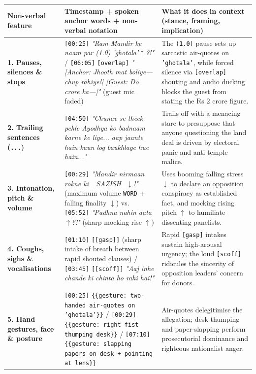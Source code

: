 \documentclass[10pt,a4paper]{article}
\begin{document}
\begin{longtable}{|p{}|p{}|p{}|}
\hline
Non-verbal feature & Timestamp + spoken anchor words + non-verbal notation & What it does in context (stance, framing, implication) \\ \hline \endhead
\textbf{1. Pauses, silences \& stops} & \texttt{[00:25]} \textit{"Ram Mandir ke naam par (1.0) 'ghotala'$\uparrow$?!"} / \texttt{[06:05]} \texttt{[overlap]} \textit{"[Anchor: Jhooth mat boliye--- chup rahiye!] [Guest: Do crore ka---]"} (guest mic faded) & The \texttt{(1.0)} pause sets up sarcastic air-quotes on \texttt{'ghotala'}, while forced silence via \texttt{[overlap]} shouting and audio ducking blocks the guest from stating the Rs 2 crore figure. \\ \hline
\textbf{2. Trailing sentences (\texttt{...})} & \texttt{[04:50]} \textit{"Chunav se theek pehle Ayodhya ko badnaam karne ke liye... aap jaante hain kaun log baukhlaye hue hain..."} & Trails off with a menacing stare to presuppose that anyone questioning the land deal is driven by electoral panic and anti-temple malice. \\ \hline
\textbf{3. Intonation, pitch \& volume} & \texttt{[00:29]} \textit{"Mandir nirmaan rokne ki \_SAZISH\_$\downarrow$!"} (maximum volume \texttt{WORD} + falling finality \texttt{$\downarrow$}) vs. \texttt{[05:52]} \textit{"Padhna nahin aata$\uparrow$?!"} (sharp mocking rise \texttt{$\uparrow$}) & Uses booming falling stress \texttt{$\downarrow$} to declare an opposition conspiracy as established fact, and mocking rising pitch \texttt{$\uparrow$} to humiliate dissenting panelists. \\ \hline
\textbf{4. Coughs, sighs \& vocalisations} & \texttt{[01:10]} \texttt{[[gasp]]} (sharp intake of breath between rapid shouted clauses) / \texttt{[03:45]} \texttt{[[scoff]]} \textit{"Aaj inhe chande ki chinta ho rahi hai!"} & Rapid \texttt{[gasp]} intakes sustain high-arousal urgency; the loud \texttt{[scoff]} ridicules the sincerity of opposition leaders' concern for donors. \\ \hline
\textbf{5. Hand gestures, face \& posture} & \texttt{[00:25]} \texttt{\{\{gesture: two-handed air-quotes on 'ghotala'\}\}} / \texttt{[00:29]} \texttt{\{\{gesture: right fist thumping desk\}\}} / \texttt{[07:10]} \texttt{\{\{gesture: slapping papers on desk + pointing at lens\}\}} & Air-quotes delegitimise the allegation; desk-thumping and paper-slapping perform prosecutorial dominance and righteous nationalist anger. \\ \hline
\end{longtable}
\end{document}
